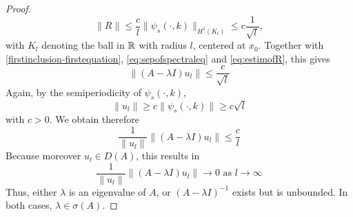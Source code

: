 \begin{theorem}
\begin{proof}
		\begin{equation}
			 \| R \| \leq \frac{c}{l} \| \psi_{s}(\cdot, k) \|_{H^{1}(K_{l})} \leq c \frac{1}{\sqrt{l}}, \label{eq:estimofR}
		\end{equation}
		with $K_{l}$ denoting the ball in $\mathbb{R}$ with radius $l$, centered at $x_{0}$. Together with \eqref{firstinclusion-firstequation}, \eqref{eq:sepofspectraleq} and \eqref{eq:estimofR}, this gives
		\[ \| (A - \lambda I) u_{l} \| \leq \frac{c}{\sqrt{l}} \]
		Again, by the semiperiodicity of $\psi_{s}(\cdot, k)$,
		\[ \| u_{l} \| \geq c \| \psi_{s}(\cdot, k) \| \geq c \sqrt{l} \]
		with $c > 0$. We obtain therefore
		\[ \frac{1}{\|u_{l}\|}\| (A - \lambda I) u_{l} \| \leq \frac{c}{l} \]
		Because moreover $u_{l} \in D(A)$, this results in
			\[ \frac{1}{\|u_{l} \|} \| (A - \lambda I) u_{l} \| \rightarrow 0 \text{ as } l \rightarrow \infty \]
		Thus, either $\lambda$ is an eigenvalue of $A$, or $(A - \lambda I)^{-1}$ exists but is unbounded. In both cases, $\lambda \in \sigma(A)$.
	\end{proof}
\end{theorem}	

